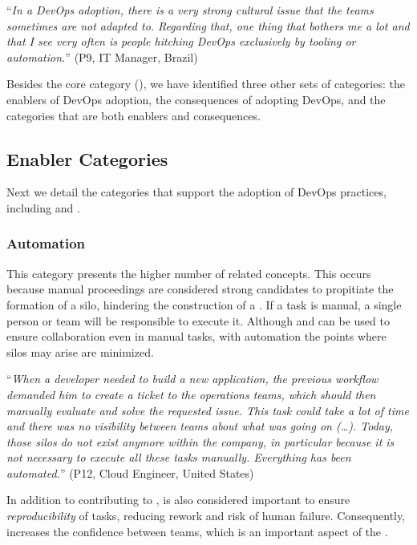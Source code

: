 \begin{mq}``\emph{In a DevOps adoption, there is a very strong cultural issue that the teams
sometimes are not adapted to. Regarding that, one thing that bothers me a lot
and that I see very often is people hitching DevOps exclusively by tooling or
automation.}'' (P9, IT Manager, Brazil)
\end{mq}

Besides the core category (\cc), we have identified
three other sets of categories: the enablers
of DevOps adoption, the consequences of adopting
DevOps, and the categories that are both enablers and consequences.

\subsection{Enabler Categories}

Next we detail the categories that support the adoption of
DevOps practices, including  and .

\subsubsection{Automation} \label{ssec:automation}

This category presents the higher number of related concepts. This
occurs because manual proceedings are considered strong candidates to
propitiate the formation of a silo, hindering the construction
of a \cc. If a task is manual, a single person or
team will be responsible to execute it. Although  and  can
be used to ensure collaboration even in manual tasks, with automation the
points where silos may arise are minimized.

\begin{mq}
``\emph{When a developer needed to build a new application, the previous workflow demanded him
to create a ticket to the operations teams, which should then manually evaluate and solve
the requested issue. This task could take a lot of time and there was no
visibility between teams about what was going on (\ldots). Today, those silos do not exist
anymore within the company, in particular because it is not necessary to execute all these tasks manually.
Everything has been automated.}'' (P12, Cloud Engineer, United States)
\end{mq}

In addition to contributing to ,  is also considered
important to ensure \emph{reproducibility} of tasks, reducing rework and risk of
human failure. Consequently,  increases the confidence
between teams, which is an important aspect of the \cc.

